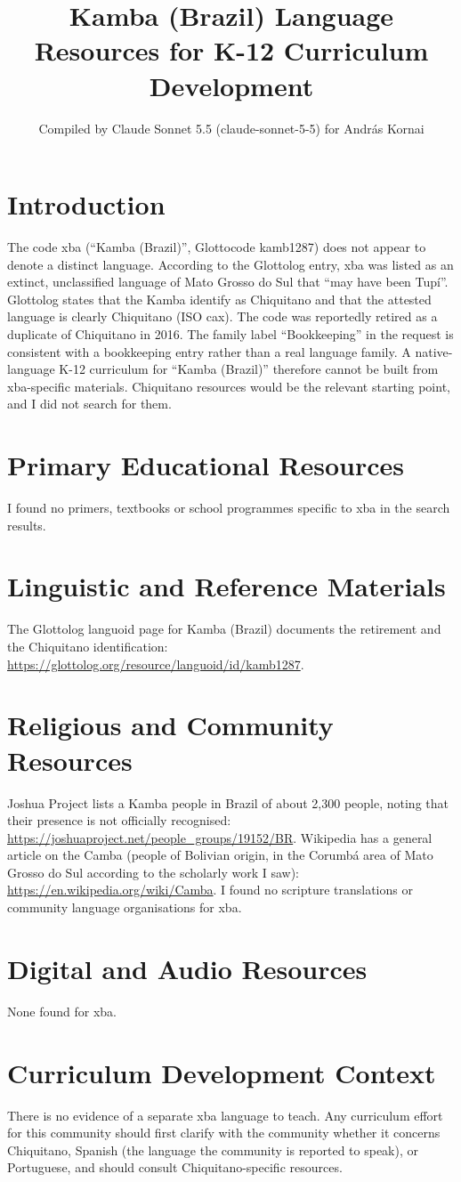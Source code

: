 \documentclass[12pt]{article}
\title{Kamba (Brazil) Language Resources for K-12 Curriculum Development}
\author{Compiled by Claude Sonnet 5.5 (claude-sonnet-5-5) for Andr\'as Kornai}
\date{}
\begin{document}
\maketitle

\section{Introduction}
The code xba (``Kamba (Brazil)'', Glottocode kamb1287) does not appear to denote a distinct language. According to the Glottolog entry, xba was listed as an extinct, unclassified language of Mato Grosso do Sul that ``may have been Tup\'i''. Glottolog states that the Kamba identify as Chiquitano and that the attested language is clearly Chiquitano (ISO cax). The code was reportedly retired as a duplicate of Chiquitano in 2016. The family label ``Bookkeeping'' in the request is consistent with a bookkeeping entry rather than a real language family. A native-language K-12 curriculum for ``Kamba (Brazil)'' therefore cannot be built from xba-specific materials. Chiquitano resources would be the relevant starting point, and I did not search for them.

\section{Primary Educational Resources}
I found no primers, textbooks or school programmes specific to xba in the search results.

\section{Linguistic and Reference Materials}
The Glottolog languoid page for Kamba (Brazil) documents the retirement and the Chiquitano identification: \url{https://glottolog.org/resource/languoid/id/kamb1287}.

\section{Religious and Community Resources}
Joshua Project lists a Kamba people in Brazil of about 2,300 people, noting that their presence is not officially recognised: \url{https://joshuaproject.net/people_groups/19152/BR}. Wikipedia has a general article on the Camba (people of Bolivian origin, in the Corumb\'a area of Mato Grosso do Sul according to the scholarly work I saw): \url{https://en.wikipedia.org/wiki/Camba}. I found no scripture translations or community language organisations for xba.

\section{Digital and Audio Resources}
None found for xba.

\section{Curriculum Development Context}
There is no evidence of a separate xba language to teach. Any curriculum effort for this community should first clarify with the community whether it concerns Chiquitano, Spanish (the language the community is reported to speak), or Portuguese, and should consult Chiquitano-specific resources.
\end{document}
